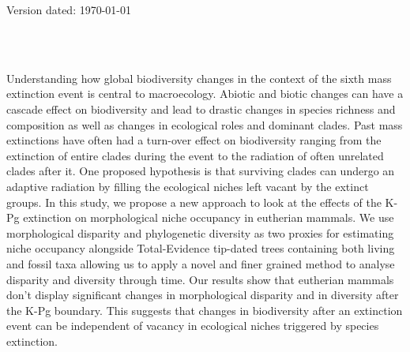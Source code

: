 \documentclass[a4paper,11pt]{article}
\begin{document}
\begin{flushright}
Version dated: \today
\end{flushright}
\begin{center}

\\
\bigskip
\\

\end{center}
Understanding how global biodiversity changes in the context of the sixth mass extinction event is central to macroecology. Abiotic and biotic changes can have a cascade effect on biodiversity and lead to drastic changes in species richness and composition as well as changes in ecological roles and dominant clades. Past mass extinctions have often had a turn-over effect on biodiversity ranging from the extinction of entire clades during the event to the radiation of often unrelated clades after it. One proposed hypothesis is that surviving clades can undergo an adaptive radiation by filling the ecological niches left vacant by the extinct groups.
In this study, we propose a new approach to look at the effects of the K-Pg extinction on morphological niche occupancy in eutherian mammals. We use morphological disparity and phylogenetic diversity as two proxies for estimating niche occupancy alongside Total-Evidence tip-dated trees containing both living and fossil taxa allowing us to apply a novel and finer grained method to analyse disparity and diversity through time.
Our results show that eutherian mammals don't display significant changes in morphological disparity and in diversity after the K-Pg boundary. This suggests that changes in biodiversity after an extinction event can be independent of vacancy in ecological niches triggered by species extinction.
\end{document}
